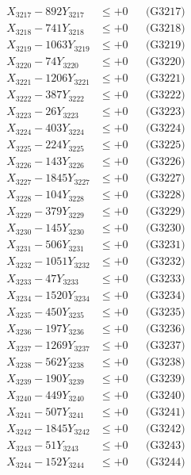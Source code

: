 \documentclass[a4paper,10pt]{article}
\begin{document}
{\begin{align}
X_{3217} - 892Y_{3217} &\leq +0 && \text{(G3217)} \\
X_{3218} - 741Y_{3218} &\leq +0 && \text{(G3218)} \\
X_{3219} - 1063Y_{3219} &\leq +0 && \text{(G3219)} \\
X_{3220} - 74Y_{3220} &\leq +0 && \text{(G3220)} \\
\allowbreak
X_{3221} - 1206Y_{3221} &\leq +0 && \text{(G3221)} \\
X_{3222} - 387Y_{3222} &\leq +0 && \text{(G3222)} \\
X_{3223} - 26Y_{3223} &\leq +0 && \text{(G3223)} \\
X_{3224} - 403Y_{3224} &\leq +0 && \text{(G3224)} \\
X_{3225} - 224Y_{3225} &\leq +0 && \text{(G3225)} \\
X_{3226} - 143Y_{3226} &\leq +0 && \text{(G3226)} \\
X_{3227} - 1845Y_{3227} &\leq +0 && \text{(G3227)} \\
X_{3228} - 104Y_{3228} &\leq +0 && \text{(G3228)} \\
X_{3229} - 379Y_{3229} &\leq +0 && \text{(G3229)} \\
X_{3230} - 145Y_{3230} &\leq +0 && \text{(G3230)} \\
\allowbreak
X_{3231} - 506Y_{3231} &\leq +0 && \text{(G3231)} \\
X_{3232} - 1051Y_{3232} &\leq +0 && \text{(G3232)} \\
X_{3233} - 47Y_{3233} &\leq +0 && \text{(G3233)} \\
X_{3234} - 1520Y_{3234} &\leq +0 && \text{(G3234)} \\
X_{3235} - 450Y_{3235} &\leq +0 && \text{(G3235)} \\
X_{3236} - 197Y_{3236} &\leq +0 && \text{(G3236)} \\
X_{3237} - 1269Y_{3237} &\leq +0 && \text{(G3237)} \\
X_{3238} - 562Y_{3238} &\leq +0 && \text{(G3238)} \\
X_{3239} - 190Y_{3239} &\leq +0 && \text{(G3239)} \\
X_{3240} - 449Y_{3240} &\leq +0 && \text{(G3240)} \\
\allowbreak
X_{3241} - 507Y_{3241} &\leq +0 && \text{(G3241)} \\
X_{3242} - 1845Y_{3242} &\leq +0 && \text{(G3242)} \\
X_{3243} - 51Y_{3243} &\leq +0 && \text{(G3243)} \\
X_{3244} - 152Y_{3244} &\leq +0 && \text{(G3244)} \\

\end{align}}
\end{document}
